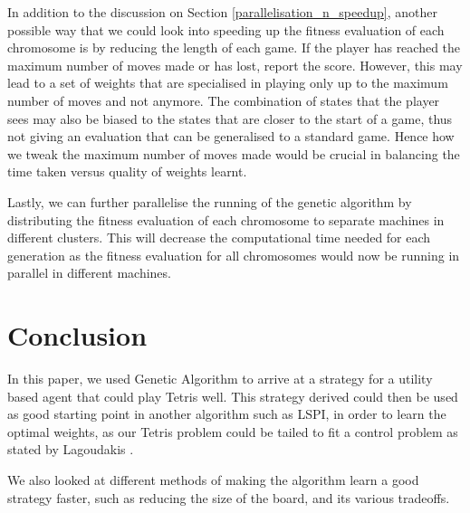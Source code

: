 \documentclass[a4paper,12pt,twocolumn]{article}
\begin{document}
In addition to the discussion on Section \ref{parallelisation_n_speedup},
another possible way that we could look into speeding up the fitness evaluation
of each chromosome is by reducing the length of each game. If the player has reached
the maximum number of moves made or has lost, report the score. However, this may
lead to a set of weights that are specialised in playing only up to the maximum
number of moves and not anymore. The combination of states that the player sees may
also be biased to the states that are closer to the start of a game, thus not
giving an evaluation that can be generalised to a standard game. Hence how we
tweak the maximum number of moves made would be crucial in balancing the
time taken versus quality of weights learnt.

Lastly, we can further parallelise the running of the genetic algorithm by distributing
the fitness evaluation of each chromosome to separate machines in different
clusters. This will decrease the computational time needed for each generation as the
fitness evaluation for all chromosomes would now be running in parallel in different
machines.

\section{Conclusion}
In this paper, we used Genetic Algorithm to arrive at a strategy for a utility based
agent that could play Tetris well. This strategy derived could then be used as good
starting point in another algorithm such as LSPI, in order to learn the optimal weights,
as our Tetris problem could be tailed to fit a control problem as stated by Lagoudakis \cite{lagoudakis}.

We also looked at different methods of making the algorithm learn a good strategy faster,
such as reducing the size of the board, and its various tradeoffs.
\end{document}
